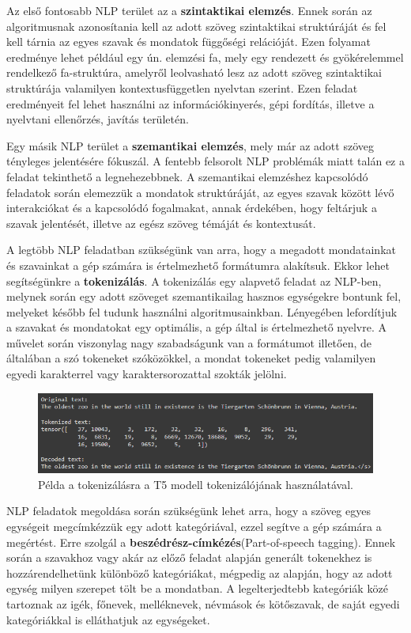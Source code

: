 Az első fontosabb NLP terület az a \textbf{szintaktikai elemzés}. Ennek során az algoritmusnak azonosítania kell az adott szöveg szintaktikai struktúráját és fel kell tárnia az egyes szavak és mondatok függőségi relációját. Ezen folyamat eredménye lehet például  egy ún. elemzési fa, mely egy rendezett és gyökérelemmel rendelkező fa-struktúra, amelyről leolvasható lesz az adott szöveg szintaktikai struktúrája valamilyen kontextusfüggetlen nyelvtan szerint. Ezen feladat eredményeit fel lehet használni az információkinyerés, gépi fordítás, illetve a nyelvtani ellenőrzés, javítás területén.

Egy másik NLP terület a \textbf{szemantikai elemzés}, mely már az adott szöveg tényleges jelentésére fókuszál. A fentebb felsorolt NLP problémák miatt talán ez a feladat tekinthető a legnehezebbnek. A szemantikai elemzéshez kapcsolódó feladatok során elemezzük a mondatok struktúráját, az egyes szavak között lévő interakciókat és a kapcsolódó fogalmakat, annak érdekében, hogy feltárjuk a szavak jelentését, illetve az egész szöveg témáját és kontextusát.

A legtöbb NLP feladatban szükségünk van arra, hogy a megadott mondatainkat és szavainkat a gép számára is értelmezhető formátumra alakítsuk. Ekkor lehet segítségünkre a \textbf{tokenizálás}. A tokenizálás egy alapvető feladat az NLP-ben, melynek során egy adott szöveget szemantikailag hasznos egységekre bontunk fel, melyeket később fel tudunk használni algoritmusainkban. Lényegében lefordítjuk a szavakat és mondatokat egy optimális, a gép által is értelmezhető nyelvre. A művelet során viszonylag nagy szabadságunk van a formátumot illetően, de általában a szó tokeneket szóközökkel, a mondat tokeneket pedig valamilyen egyedi karakterrel vagy karaktersorozattal szokták jelölni.

\begin{figure}[h]
\centering
\includegraphics[scale=0.6]{images/tokenization.png}
\caption{Példa a tokenizálásra a T5 modell tokenizálójának használatával.}
\label{fig:tokenization}
\end{figure}

NLP feladatok megoldása során szükségünk lehet arra, hogy a szöveg egyes egységeit megcímkézzük egy adott kategóriával, ezzel segítve a gép számára a megértést. Erre szolgál a \textbf{beszédrész-címkézés}(Part-of-speech tagging). Ennek során a szavakhoz vagy akár az előző feladat alapján generált tokenekhez is hozzárendelhetünk különböző kategóriákat, mégpedig az alapján, hogy az adott egység milyen szerepet tölt be a mondatban. A legelterjedtebb kategóriák közé tartoznak az igék, főnevek, melléknevek, névmások és kötőszavak, de saját egyedi kategóriákkal is elláthatjuk az egységeket.


